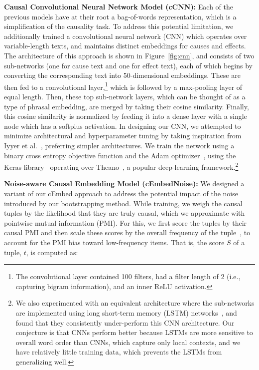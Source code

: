 {\flushleft \textbf{Causal Convolutional Neural Network Model (cCNN):}}
Each of the previous models have at their root a bag-of-words representation, which is a simplification of the causality task. To address this potential limitation, we additionally trained a convolutional neural network (CNN) which operates over variable-length texts, and maintains distinct embeddings for causes and effects.  The architecture of this approach is shown in Figure~\ref{fig:cnn}, and consists of two sub-networks (one for cause text and one for effect text), each of which begins by converting the corresponding text 
into 50-dimensional embeddings.  These are then fed to a convolutional layer,\footnote{The convolutional layer contained 100 filters, had a filter length of 2 (i.e., capturing bigram information), and an inner ReLU activation.} which is followed by a max-pooling layer of equal length.
Then, these top sub-network layers, which can be thought of as a type of phrasal embedding, are merged by taking their cosine similarity.  Finally, this cosine similarity is normalized by feeding it into a dense layer with a single node which has a softplus activation.  
In designing our CNN, we attempted to minimize architectural and hyperparameter tuning by taking inspiration from Iyyer et al.~, preferring simpler architectures.
We train the network using a binary cross entropy objective function and the Adam optimizer~\cite{kingma2014adam}, using the Keras library~\cite{chollet2015keras} operating over Theano~\cite{2016arXiv160502688short}, a popular deep-learning framework.\footnote{We also experimented with an equivalent architecture where the sub-networks are implemented using long short-term memory (LSTM) networks~\cite{hochreiter1997long}, and found that they consistently under-perform this CNN architecture. Our conjecture is that CNNs perform better because LSTMs are more sensitive to overall word order than CNNs, which capture only local contexts, and we have relatively little training data, which prevents the LSTMs from generalizing well.}

{\flushleft \textbf{Noise-aware Causal Embedding Model (cEmbedNoise):}} 
We designed a variant of our cEmbed approach to address the potential impact of the noise introduced by our bootstrapping method.
While training, we weigh the causal tuples by the likelihood that they are truly causal, which we approximate with pointwise mutual information (PMI).
For this, we first score the tuples by their causal PMI and then scale these scores by the overall frequency of the tuple~\cite{riloff1996automatically}, to account for the PMI bias toward low-frequency items.  That is, the score $S$ of a tuple, $t$, is computed as: 

